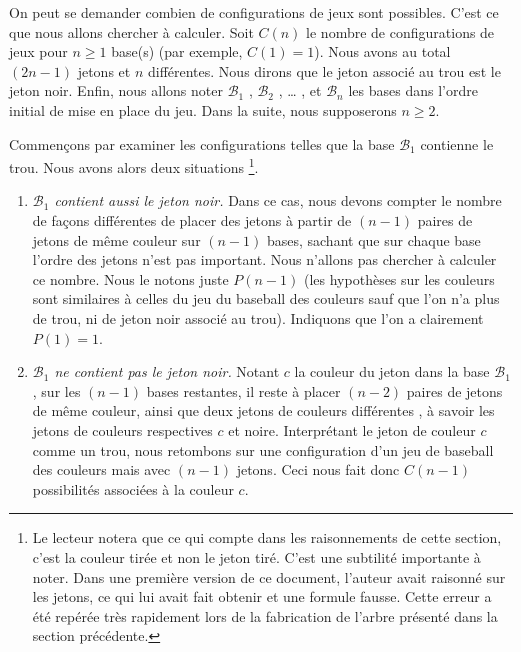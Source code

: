On peut se demander combien de configurations de jeux sont possibles. C'est ce que nous allons chercher à calculer. Soit $C(n)$ le nombre de configurations de jeux pour $n \geqslant 1$ base(s) (par exemple, $C(1) = 1$). Nous avons au total $(2n - 1)$ jetons et $n$  différentes.
Nous dirons que le jeton associé au trou est le jeton noir. 
Enfin, nous allons noter $\mathcal{B}_1$ , $\mathcal{B}_2$ , \dots{} , et  $\mathcal{B}_n$ les bases  dans l'ordre initial de mise en place du jeu. Dans la suite, nous supposerons $n \geqslant 2$.


\medskip

Commençons par examiner les configurations telles que la base $\mathcal{B}_1$ contienne le trou. Nous avons alors deux situations
\footnote{
	Le lecteur notera que ce qui compte dans les raisonnements de cette section, c'est la couleur tirée et non le jeton tiré. C'est une subtilité importante à noter.
	Dans une première version de ce document, l'auteur avait raisonné sur les jetons, ce qui lui avait fait obtenir et  une formule fausse.
	Cette erreur a été repérée très rapidement lors de la fabrication de l'arbre présenté dans la section précédente.
}.

\begin{enumerate}
    \item \textit{$\mathcal{B}_1$ contient aussi le jeton noir.} 
    Dans ce cas, nous devons compter le nombre de façons différentes de placer des jetons à partir de $(n - 1)$ paires de jetons de même couleur sur $(n-1)$ bases, sachant que sur chaque base l'ordre des jetons n'est pas important. Nous n'allons pas chercher à calculer ce nombre. Nous le notons juste $P(n - 1)$ (les hypothèses sur les couleurs sont similaires à celles du jeu du baseball des couleurs sauf que l'on n'a plus de trou, ni de jeton noir associé au trou). Indiquons que l'on a clairement $P(1) = 1$.
        
    \item \textit{$\mathcal{B}_1$ ne contient pas le jeton noir.} 
    Notant $c$ la couleur du jeton dans la base $\mathcal{B}_1$, sur les $(n-1)$ bases restantes, il reste à placer $(n - 2)$ paires de jetons de même couleur, ainsi que deux jetons de couleurs différentes , à savoir les jetons de couleurs respectives $c$ et noire. Interprétant le jeton de couleur $c$ comme un trou, nous retombons sur une configuration d'un jeu de baseball des couleurs mais avec $(n-1)$ jetons. Ceci nous fait donc $C(n -1)$ possibilités associées à la couleur $c$. 
\end{enumerate}


